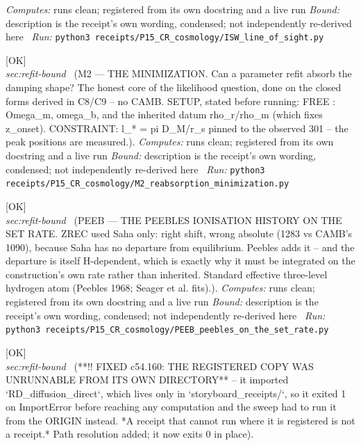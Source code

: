 \begin{description}
\emph{Computes:} runs clean; registered from its own docstring and a live run
 \emph{Bound:} description is the receipt's own wording, condensed; not independently re-derived here
\ \emph{Run:} \texttt{python3 receipts/P15\_CR\_cosmology/ISW\_line\_of\_sight.py}
\item[\rcptlabel{M2_reabsorption_minimization}{P15R58}\textbf{P15R58}\quad\texttt{M2\_reabsorption\_minimization}]\hfill\textsf{[OK]}\\
\textit{sec:refit-bound} \ (M2 --- THE MINIMIZATION. Can a parameter refit absorb the damping shape? The honest core of the likelihood question, done on the closed forms derived in C8/C9 -- no CAMB. SETUP, stated before running: FREE : Omega\_m, omega\_b, and the inherited datum rho\_r/rho\_m (which fixes z\_onset). CONSTRAINT: l\_* = pi D\_M/r\_s pinned to the observed 301 -- the peak positions are measured.). 
\emph{Computes:} runs clean; registered from its own docstring and a live run
 \emph{Bound:} description is the receipt's own wording, condensed; not independently re-derived here
\ \emph{Run:} \texttt{python3 receipts/P15\_CR\_cosmology/M2\_reabsorption\_minimization.py}
\item[\rcptlabel{PEEB_peebles_on_the_set_rate}{P15R59}\textbf{P15R59}\quad\texttt{PEEB\_peebles\_on\_the\_set\_rate}]\hfill\textsf{[OK]}\\
\textit{sec:refit-bound} \ (PEEB --- THE PEEBLES IONISATION HISTORY ON THE SET RATE. ZREC used Saha only: right shift, wrong absolute (1283 vs CAMB's 1090), because Saha has no departure from equilibrium. Peebles adds it -- and the departure is itself H-dependent, which is exactly why it must be integrated on the construction's own rate rather than inherited. Standard effective three-level hydrogen atom (Peebles 1968; Seager et al. fits).). 
\emph{Computes:} runs clean; registered from its own docstring and a live run
 \emph{Bound:} description is the receipt's own wording, condensed; not independently re-derived here
\ \emph{Run:} \texttt{python3 receipts/P15\_CR\_cosmology/PEEB\_peebles\_on\_the\_set\_rate.py}
\item[\rcptlabel{ROBUST_p1p2_scan}{P15R60}\textbf{P15R60}\quad\texttt{ROBUST\_p1p2\_scan}]\hfill\textsf{[OK]}\\
\textit{sec:refit-bound} \ (**!! FIXED c54.160: THE REGISTERED COPY WAS UNRUNNABLE FROM ITS OWN DIRECTORY** -- it imported `RD\_diffusion\_direct`, which lives only in `storyboard\_receipts/`, so it exited 1 on ImportError before reaching any computation and the sweep had to run it from the ORIGIN instead. *A receipt that cannot run where it is registered is not a receipt.* Path resolution added; it now exits 0 in place). 

\end{description}
